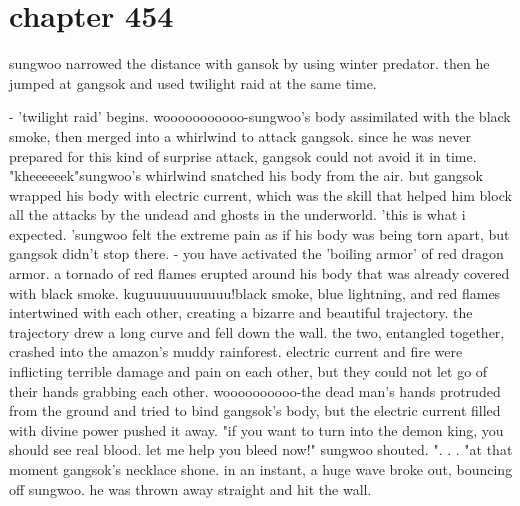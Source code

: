 \section{chapter 454}

sungwoo narrowed the distance with gansok by using winter predator.
 then he jumped at gangsok and used twilight raid at the same time.





- 'twilight raid' begins.
wooooooooooo-sungwoo's body assimilated with the black smoke, then merged into a whirlwind to attack gangsok.
 since he was never prepared for this kind of surprise attack, gangsok could not avoid it in time.
 "kheeeeeek"sungwoo's whirlwind snatched his body from the air.
but gangsok wrapped his body with electric current, which was the skill that helped him block all the attacks by the undead and ghosts in the underworld.
'this is what i expected.
'sungwoo felt the extreme pain as if his body was being torn apart, but gangsok didn't stop there.
 - you have activated the 'boiling armor' of red dragon armor.
a tornado of red flames erupted around his body that was already covered with black smoke.
kuguuuuuuuuuuu!black smoke, blue lightning, and red flames intertwined with each other, creating a bizarre and beautiful trajectory.
 the trajectory drew a long curve and fell down the wall.
the two, entangled together, crashed into the amazon's muddy rainforest.
 electric current and fire were inflicting terrible damage and pain on each other, but they could not let go of their hands grabbing each other.
woooooooooo-the dead man's hands protruded from the ground and tried to bind gangsok's body, but the electric current filled with divine power pushed it away.
"if you want to turn into the demon king, you should see real blood.
 let me help you bleed now!" sungwoo shouted.
".
.
.
"at that moment gangsok's necklace shone.
in an instant, a huge wave broke out, bouncing off sungwoo.
 he was thrown away straight and hit the wall.

